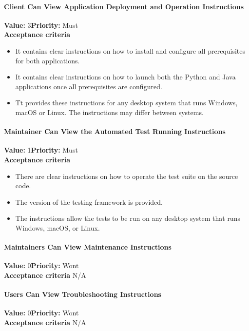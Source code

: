 \paragraph{Client Can View Application Deployment and Operation Instructions}
\textbf{Value:} 3\quad \textbf{Priority:} Must\\
\textbf{Acceptance criteria}
\begin{itemize}
  \item It contains clear instructions on how to install and configure all prerequisites for both applications.
  \item It contains clear instructions on how to launch both the Python and Java applications once all prerequisites are configured.
  \item Tt provides these instructions for any desktop system that runs Windows, macOS or Linux. The instructions may differ between systems.
\end{itemize}

\paragraph{Maintainer Can View the Automated Test Running Instructions}
\textbf{Value:} 1\quad \textbf{Priority:} Must\\
\textbf{Acceptance criteria}
\begin{itemize}
  \item There are clear instructions on how to operate the test suite on the source code.
  \item The version of the testing framework is provided.
  \item The instructions allow the tests to be run on any desktop system that runs Windows, macOS, or Linux.
\end{itemize}

\paragraph{Maintainers Can View Maintenance Instructions}
\textbf{Value:} 0\quad \textbf{Priority:} Wont\\
\textbf{Acceptance criteria} N/A

\paragraph{Users Can View Troubleshooting Instructions}
\textbf{Value:} 0\quad \textbf{Priority:} Wont\\
\textbf{Acceptance criteria} N/A


